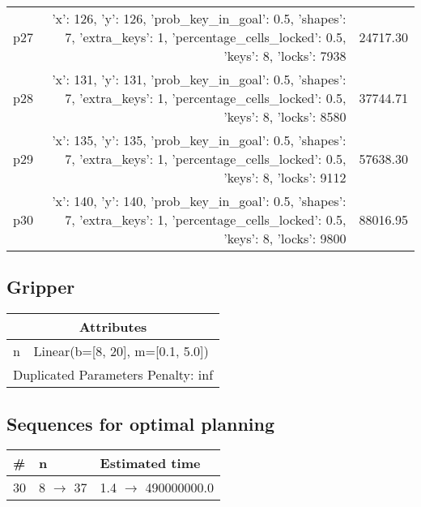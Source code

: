 \documentclass{article}
\begin{document}
\begin{center}
\begin{tabular}{@{}l|r|r@{}}
  p27&{'x': 126, 'y': 126, 'prob\_key\_in\_goal': 0.5, 'shapes': 7, 'extra\_keys': 1, 'percentage\_cells\_locked': 0.5, 'keys': 8, 'locks': 7938}&24717.30\\
  p28&{'x': 131, 'y': 131, 'prob\_key\_in\_goal': 0.5, 'shapes': 7, 'extra\_keys': 1, 'percentage\_cells\_locked': 0.5, 'keys': 8, 'locks': 8580}&37744.71\\
  p29&{'x': 135, 'y': 135, 'prob\_key\_in\_goal': 0.5, 'shapes': 7, 'extra\_keys': 1, 'percentage\_cells\_locked': 0.5, 'keys': 8, 'locks': 9112}&57638.30\\
  p30&{'x': 140, 'y': 140, 'prob\_key\_in\_goal': 0.5, 'shapes': 7, 'extra\_keys': 1, 'percentage\_cells\_locked': 0.5, 'keys': 8, 'locks': 9800}&88016.95
                            \end{tabular}
                            \end{center}
                    
                            \newpage \subsection{Gripper}
                    \begin{center}
                    \begin{tabular}{@{}p{}p{}@{}}
                    \multicolumn{2}{c}{\bf \large Attributes}\\\midrule
                    n & Linear(b=[8, 20], m=[0.1, 5.0]) \\\midrule
                    \multicolumn{2}{l}{Duplicated Parameters Penalty: inf}
                    \end{tabular}
                    \end{center}
                
                            \subsection*{Sequences for optimal planning}

                            \begin{center}
                            \begin{tabular}{@{}l|l|l@{}}
                            \# & n & Estimated time\\\midrule
                            30&8 $\rightarrow$ 37&1.4 $\rightarrow$ 490000000.0
                            \end{tabular}
                            \end{center}
                    
\end{document}
